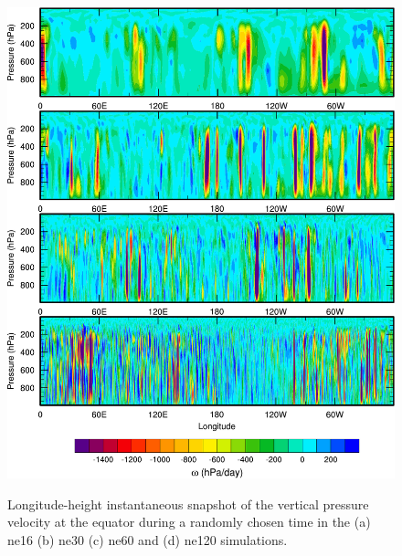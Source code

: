 \begin{figure}
\begin{center}
\noindent\includegraphics[width=35pc,angle=0]{chapter2/figure6.pdf}\\
\end{center}
\caption{Longitude-height instantaneous snapshot of the vertical pressure velocity at the equator during a randomly chosen time in the (a) ne16 (b) ne30 (c) ne60 and (d) ne120 simulations.}
\label{fig:figure2-6}
\end{figure}


